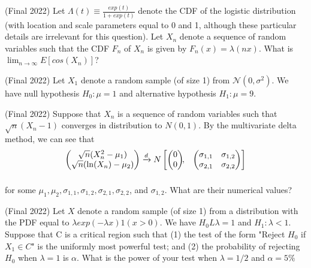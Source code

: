 \documentclass[answers]{exam}
\begin{document}
\begin{questions}
\question (Final 2022) Let $\Lambda(t) \equiv \frac{exp(t)}{1+exp(t)}$ denote the CDF of the logistic distribution (with location and scale parameters equal to 0 and 1, although these particular details are irrelevant for this question). Let $X_n$ denote a sequence of random variables such that the CDF $F_n$ of $X_n$ is given by $F_n(x) = \lambda(nx)$. What is $\lim_{n \to \infty} E[cos(X_n)]$?
\begin{solution}
\end{solution}

\question (Final 2022) Let $X_1$ denote a random sample (of size 1) from $\mathcal{N}(0, \sigma^2)$. We have null hypothesis $H_0: \mu = 1$ and alternative hypothesis $H_1: \mu = 9$.
\begin{solution} 
\end{solution}

\question (Final 2022) Suppose that $X_n$ is a sequence of random variables such that $\sqrt{n}(X_n-1)$ converges in distribution to $N(0,1)$. By the multivariate delta method, we can see that
\begin{align*}
    \begin{pmatrix}
    \sqrt{n}(X_n^2-\mu_1)\\
    \sqrt{n}(\ln(X_n) - \mu_2)\\
    \end{pmatrix} 
    &\xrightarrow{d}  N
    \begin{bmatrix}
    \begin{pmatrix}
    0\\
    0
    \end{pmatrix}\!\!,&
    \begin{pmatrix}
    \sigma_{1,1} & \sigma_{1,2}\\
    \sigma_{2,1} & \sigma_{2,2}
    \end{pmatrix}
    \end{bmatrix}\\[2\jot]
    \end{align*}

for some $\mu_1, \mu_2, \sigma_{1,1}, \sigma_{1,2}, \sigma_{2,1}, \sigma_{2,2}$, and $\sigma_{1,2}$. What are their numerical values?
\begin{solution}
\end{solution}

\question (Final 2022) Let $X$ denote a random sample (of size 1) from a distribution with the PDF equal to $\lambda exp(-\lambda x) 1(x>0)$. We have $H_0 L \lambda = 1$ and $H_1 : \lambda < 1$. Suppose that C is a critical region such that (1) the test of the form "Reject $H_0$ if $X_1 \in C$" is the uniformly most powerful test; and (2) the probability of rejecting $H_0$ when $\lambda = 1$ is $\alpha$. What is the power of your test when $\lambda = 1/2$ and $\alpha = 5\%$
\begin{solution}
\end{solution}


\end{questions}
\end{document}
